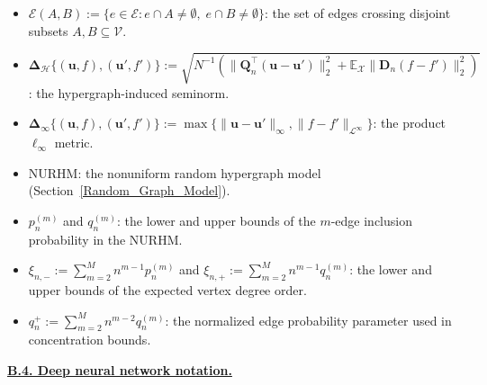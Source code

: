 \documentclass[
  12pt]{article}
\begin{document}
\begin{itemize}
    \item $\mathcal{E}(A, B) := \{e \in \mathcal{E} : e \cap A \neq \emptyset,\; e \cap B \neq \emptyset\}$: the set of edges crossing disjoint subsets $A, B \subseteq \mathcal{V}$.
    \item $\mathbf{\Delta}_{\mathcal{H}}\{(\boldsymbol{u},f),(\boldsymbol{u}',f')\} := \sqrt{N^{-1}(\|\boldsymbol{Q}_n^\top(\boldsymbol{u}-\boldsymbol{u}')\|_2^2 + \mathbb{E}_{\mathcal{X}}\|\boldsymbol{D}_n(f-f')\|_2^2)}$: the hypergraph-induced seminorm.
    \item $\mathbf{\Delta}_\infty\{(\boldsymbol{u},f),(\boldsymbol{u}',f')\} := \max\{\|\boldsymbol{u} - \boldsymbol{u}'\|_\infty, \|f - f'\|_{\mathcal{L}^\infty}\}$: the product $\ell_\infty$ metric.
    \item NURHM: the nonuniform random hypergraph model (Section~\ref{Random_Graph_Model}).
    \item $p_n^{(m)}$ and $q_n^{(m)}$: the lower and upper bounds of the $m$-edge inclusion probability in the NURHM.
    \item $\xi_{n,-} := \sum_{m=2}^M n^{m-1} p_n^{(m)}$ and $\xi_{n,+} := \sum_{m=2}^M n^{m-1} q_n^{(m)}$: the lower and upper bounds of the expected vertex degree order.
    \item $q_n^{+} := \sum_{m=2}^M n^{m-2} q_n^{(m)}$: the normalized edge probability parameter used in concentration bounds.
\end{itemize}
\underline{\textbf{B.4. Deep neural network notation.}}
\end{document}
